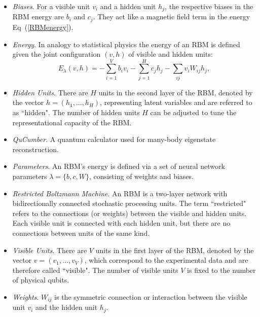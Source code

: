 \documentclass[submission, Phys]{SciPost}
\begin{document}
\begin{itemize}

\item {\it Biases}.  For a visible unit $v_i$ and a hidden unit $h_j$, the respective biases in the RBM energy are $b_i$ and $c_j$. They act like a magnetic field term in the energy Eq~(\ref{RBMenergy}).

\item {\it Energy}.  In analogy to statistical physics the energy of an RBM is defined given the joint configuration $(v,h)$ of visible and hidden units:
\begin{equation}
E_{\lambda}(v,h) = - \sum\limits_{i=1}^V b_i v_i - \sum\limits_{j=1}^H c_j h_j - \sum\limits_{ij} v_i W_{ij} h_j, \label{RBMenergy} 
\end{equation}

\item {\it Hidden Units}.  There are $H$ units in the second layer of the RBM, denoted by the vector $h=(h_1, ..., h_H)$, representing latent variables and are referred to as ``hidden".  The number of hidden units $H$ can be adjusted to tune the representational capacity of the RBM.

\item {\it QuCumber}. A quantum calculator used for many-body eigenstate reconstruction.

\item {\it Parameters}.  An RBM's energy is defined via a set of neural network parameters $\lambda = \{b,c,W\}$, consisting of weights and biases.

\item {\it Restricted Boltzmann Machine}.  An RBM is a two-layer network with bidirectionally connected stochastic processing units.  The term ``restricted" refers to the connections (or weights) between the visible and hidden units. Each visible unit is connected with each hidden unit, but there are no connections between units of the same kind.

\item {\it Visible Units}.  There are $V$ units in the first layer of the RBM, denoted by the vector $v=(v_1, ..., v_V)$, which correspond to the experimental data and are therefore called ``visible".  The number of visible units $V$ is fixed to the number of physical qubits.

\item {\it Weights}.  $W_{ij}$ is the symmetric connection or interaction between the visible unit $v_i$ and the hidden unit $h_j$.

\end{itemize}
\end{document}
